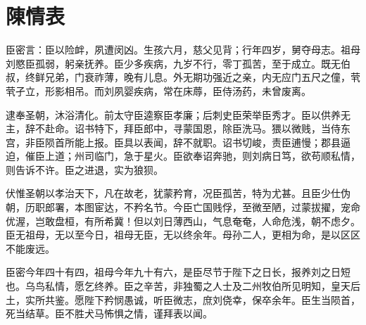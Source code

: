 \section{ 陳情表}

臣密言：臣以险衅，夙遭闵凶。生孩六月，慈父见背；行年四岁，舅夺母志。祖母刘愍臣孤弱，躬亲抚养。臣少多疾病，九岁不行，零丁孤苦，至于成立。既无伯叔，终鲜兄弟，门衰祚薄，晚有儿息。外无期功强近之亲，内无应门五尺之僮，茕茕孑立，形影相吊。而刘夙婴疾病，常在床蓐，臣侍汤药，未曾废离。

逮奉圣朝，沐浴清化。前太守臣逵察臣孝廉；后刺史臣荣举臣秀才。臣以供养无主，辞不赴命。诏书特下，拜臣郎中，寻蒙国恩，除臣洗马。猥以微贱，当侍东宫，非臣陨首所能上报。臣具以表闻，辞不就职。诏书切峻，责臣逋慢；郡县逼迫，催臣上道；州司临门，急于星火。臣欲奉诏奔驰，则刘病日笃，欲苟顺私情，则告诉不许。臣之进退，实为狼狈。

伏惟圣朝以孝治天下，凡在故老，犹蒙矜育，况臣孤苦，特为尤甚。且臣少仕伪朝，历职郎署，本图宦达，不矜名节。今臣亡国贱俘，至微至陋，过蒙拔擢，宠命优渥，岂敢盘桓，有所希冀！但以刘日薄西山，气息奄奄，人命危浅，朝不虑夕。臣无祖母，无以至今日，祖母无臣，无以终余年。母孙二人，更相为命，是以区区不能废远。

臣密今年四十有四，祖母今年九十有六，是臣尽节于陛下之日长，报养刘之日短也。乌鸟私情，愿乞终养。臣之辛苦，非独蜀之人士及二州牧伯所见明知，皇天后土，实所共鉴。愿陛下矜悯愚诚，听臣微志，庶刘侥幸，保卒余年。臣生当陨首，死当结草。臣不胜犬马怖惧之情，谨拜表以闻。